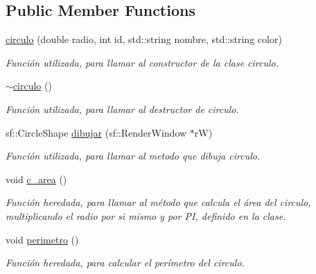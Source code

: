 \subsection*{Public Member Functions}
\begin{DoxyCompactItemize}
\item 
\hyperlink{classcirculo_a5a035141e32d31d290d9a707894ec418}{circulo} (double radio, int id, std\+::string nombre, std\+::string color)
\begin{DoxyCompactList}\small\item\em Función utilizada, para llamar al constructor de la clase circulo. \end{DoxyCompactList}\item 
\mbox{\label{classcirculo_a4b175bd2b25be1def566c1f84e13932c}} 
\hyperlink{classcirculo_a4b175bd2b25be1def566c1f84e13932c}{$\sim$circulo} ()
\begin{DoxyCompactList}\small\item\em Función utilizada, para llamar al destructor de circulo. \end{DoxyCompactList}\item 
sf\+::\+Circle\+Shape \hyperlink{classcirculo_ab67562f2a62b5de13b4208b8aa83a0fb}{dibujar} (sf\+::\+Render\+Window $\ast$rW)
\begin{DoxyCompactList}\small\item\em Función utilizada, para llamar al metodo que dibuja circulo. \end{DoxyCompactList}\item 
\mbox{\label{classcirculo_ae229e0665a893888c4c35f53ba407dda}} 
void \hyperlink{classcirculo_ae229e0665a893888c4c35f53ba407dda}{c\+\_\+area} ()
\begin{DoxyCompactList}\small\item\em Función heredada, para llamar al método que calcula el área del circulo, multiplicando el radio por si mismo y por PI, definido en la clase. \end{DoxyCompactList}\item 
\mbox{\label{classcirculo_a1e6b523f98f276c780a36cd29f25a15e}} 
void \hyperlink{classcirculo_a1e6b523f98f276c780a36cd29f25a15e}{perimetro} ()
\begin{DoxyCompactList}\small\item\em Función heredada, para calcular el perímetro del circulo. \end{DoxyCompactList}\item 

\end{DoxyCompactItemize}
